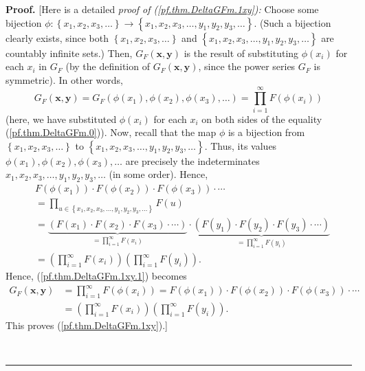 \documentclass[numbers=enddot,12pt,final,onecolumn,notitlepage]{scrartcl}%
\theoremstyle{definition}
\newenvironment{proof}[1][Proof]{\noindent\textbf{#1.} }{\ \rule{0.5em}{0.5em}}
\let\prodnonlimits\prod
\renewcommand{\prod}{\prodnonlimits\limits}
\newenvironment{verlong}{}{}
\begin{document}
\begin{verlong}
\begin{proof}
[Here is a detailed \textit{proof of (\ref{pf.thm.DeltaGFm.1xy}):} Choose some
bijection $\phi:\left\{  x_{1},x_{2},x_{3},\ldots\right\}  \rightarrow\left\{
x_{1},x_{2},x_{3},\ldots,y_{1},y_{2},y_{3},\ldots\right\}  $. (Such a
bijection clearly exists, since both $\left\{  x_{1},x_{2},x_{3}%
,\ldots\right\}  $ and $\left\{  x_{1},x_{2},x_{3},\ldots,y_{1},y_{2}%
,y_{3},\ldots\right\}  $ are countably infinite sets.) Then, $G_{F}\left(
\mathbf{x},\mathbf{y}\right)  $ is the result of substituting $\phi\left(
x_{i}\right)  $ for each $x_{i}$ in $G_{F}$ (by the definition of
$G_{F}\left(  \mathbf{x},\mathbf{y}\right)  $, since the power series $G_{F}$
is symmetric). In other words,%
\begin{equation}
G_{F}\left(  \mathbf{x},\mathbf{y}\right)  =G_{F}\left(  \phi\left(
x_{1}\right)  ,\phi\left(  x_{2}\right)  ,\phi\left(  x_{3}\right)
,\ldots\right)  =\prod_{i=1}^{\infty}F\left(  \phi\left(  x_{i}\right)
\right)  \label{pf.thm.DeltaGFm.1xy.1}%
\end{equation}
(here, we have substituted $\phi\left(  x_{i}\right)  $ for each $x_{i}$ on
both sides of the equality (\ref{pf.thm.DeltaGFm.0})). Now, recall that the
map $\phi$ is a bijection from $\left\{  x_{1},x_{2},x_{3},\ldots\right\}  $
to $\left\{  x_{1},x_{2},x_{3},\ldots,y_{1},y_{2},y_{3},\ldots\right\}  $.
Thus, its values $\phi\left(  x_{1}\right)  ,\phi\left(  x_{2}\right)
,\phi\left(  x_{3}\right)  ,\ldots$ are precisely the indeterminates
\newline$x_{1},x_{2},x_{3},\ldots,y_{1},y_{2},y_{3},\ldots$ (in some order).
Hence,%
\begin{align*}
&  F\left(  \phi\left(  x_{1}\right)  \right)  \cdot F\left(  \phi\left(
x_{2}\right)  \right)  \cdot F\left(  \phi\left(  x_{3}\right)  \right)
\cdot\cdots\\
&  =\prod_{u\in\left\{  x_{1},x_{2},x_{3},\ldots,y_{1},y_{2},y_{3}%
,\ldots\right\}  }F\left(  u\right) \\
&  =\underbrace{\left(  F\left(  x_{1}\right)  \cdot F\left(  x_{2}\right)
\cdot F\left(  x_{3}\right)  \cdot\cdots\right)  }_{=\prod_{i=1}^{\infty
}F\left(  x_{i}\right)  }\cdot\underbrace{\left(  F\left(  y_{1}\right)  \cdot
F\left(  y_{2}\right)  \cdot F\left(  y_{3}\right)  \cdot\cdots\right)
}_{=\prod_{i=1}^{\infty}F\left(  y_{i}\right)  }\\
&  =\left(  \prod_{i=1}^{\infty}F\left(  x_{i}\right)  \right)  \left(
\prod_{i=1}^{\infty}F\left(  y_{i}\right)  \right)  .
\end{align*}
Hence, (\ref{pf.thm.DeltaGFm.1xy.1}) becomes%
\begin{align*}
G_{F}\left(  \mathbf{x},\mathbf{y}\right)   &  =\prod_{i=1}^{\infty}F\left(
\phi\left(  x_{i}\right)  \right)  =F\left(  \phi\left(  x_{1}\right)
\right)  \cdot F\left(  \phi\left(  x_{2}\right)  \right)  \cdot F\left(
\phi\left(  x_{3}\right)  \right)  \cdot\cdots\\
&  =\left(  \prod_{i=1}^{\infty}F\left(  x_{i}\right)  \right)  \left(
\prod_{i=1}^{\infty}F\left(  y_{i}\right)  \right)  .
\end{align*}
This proves (\ref{pf.thm.DeltaGFm.1xy}).]


\end{proof}
\end{verlong}
\end{document}
